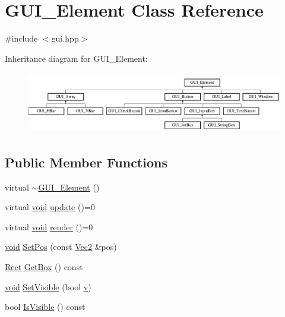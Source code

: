 \hypertarget{class_g_u_i___element}{\section{G\-U\-I\-\_\-\-Element Class Reference}
\label{class_g_u_i___element}
}


{\ttfamily \#include $<$gui.\-hpp$>$}

Inheritance diagram for G\-U\-I\-\_\-\-Element\-:\begin{figure}[H]
\begin{center}
\leavevmode
\includegraphics[height=2.711864cm]{class_g_u_i___element}
\end{center}
\end{figure}
\subsection*{Public Member Functions}
\begin{DoxyCompactItemize}
\item 
virtual \hyperlink{class_g_u_i___element_a96e79622bfd7228a05d991c852262599}{$\sim$\-G\-U\-I\-\_\-\-Element} ()
\item 
virtual \hyperlink{_s_d_l__opengles2__gl2ext_8h_ae5d8fa23ad07c48bb609509eae494c95}{void} \hyperlink{class_g_u_i___element_abc13729af781e088066710336c14234c}{update} ()=0
\item 
virtual \hyperlink{_s_d_l__opengles2__gl2ext_8h_ae5d8fa23ad07c48bb609509eae494c95}{void} \hyperlink{class_g_u_i___element_a877f1e7d670634e6a4cc8e0227a65bda}{render} ()=0
\item 
\hyperlink{_s_d_l__opengles2__gl2ext_8h_ae5d8fa23ad07c48bb609509eae494c95}{void} \hyperlink{class_g_u_i___element_adb7aca2c79b8c416e813242efec0896d}{Set\-Pos} (const \hyperlink{class_vec2}{Vec2} \&pos)
\item 
\hyperlink{class_rect}{Rect} \hyperlink{class_g_u_i___element_a6218ee3e4d0111ec9b89a84bb6fcb0a6}{Get\-Box} () const 
\item 
\hyperlink{_s_d_l__opengles2__gl2ext_8h_ae5d8fa23ad07c48bb609509eae494c95}{void} \hyperlink{class_g_u_i___element_aa485cc97186c3bd8679594d930ce6718}{Set\-Visible} (bool \hyperlink{_s_d_l__opengl_8h_a10a82eabcb59d2fcd74acee063775f90}{v})
\item 
bool \hyperlink{class_g_u_i___element_a91118a362af7f8577dc11a4bdd8c2390}{Is\-Visible} () const 
\end{DoxyCompactItemize}
